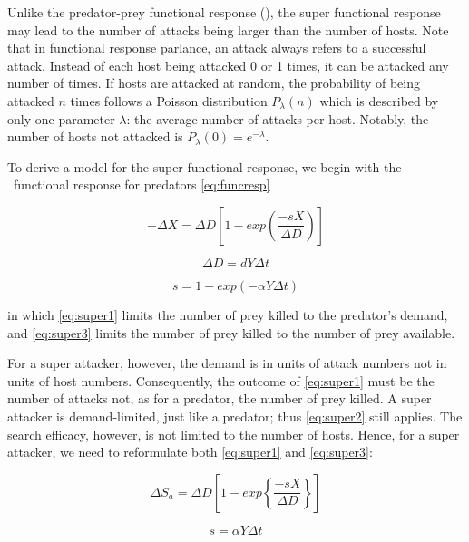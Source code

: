 Unlike the predator-prey functional response (), the super functional response may lead to the number of attacks being larger than the number of hosts. Note that in functional response parlance, an attack always refers to a successful attack. Instead of each host being attacked 0 or 1 times, it can be attacked any number of times. If hosts are attacked at random, the probability of being attacked $n$ times follows a Poisson distribution $P_{\lambda}(n)$ which is described by only one parameter $\lambda$: the average number of attacks per host. Notably, the number of hosts not attacked is $P_{\lambda}(0)=e^{-\lambda}$.

To derive a model for the super functional response, we begin with the \GB\ functional response for predators \eqref{eq:funcresp}

\begin{equation}
-\Delta X = \Delta D \left[1-exp\left(\frac{-sX}{\Delta D}\right)\right] \label{eq:super1}
\end{equation}

\begin{equation}
  \Delta D = dY\Delta t \label{eq:super2}
\end{equation}

\begin{equation}
  s = 1-exp(-\alpha Y \Delta t) \label{eq:super3}
\end{equation}

\noindent in which \eqref{eq:super1} limits the number of prey killed to the predator's demand, and \eqref{eq:super3} limits the number of prey killed to the number of prey available. 

For a super attacker, however, the demand is in units of attack numbers not in units of host numbers. Consequently, the outcome of \eqref{eq:super1} must be the number of attacks not, as for a predator, the number of prey killed. A super attacker is demand-limited, just like a predator; thus \eqref{eq:super2} still applies. The search efficacy, however, is not limited to the number of hosts. Hence, for a super attacker, we need to reformulate both \eqref{eq:super1} and \eqref{eq:super3}:

\begin{equation}
  \Delta S_a = \Delta D \left[1-exp\left\{\frac{-sX}{\Delta D}\right\}\right] \label{eq:super4}
\end{equation}

\begin{equation}
  s = \alpha Y \Delta t \label{eq:super5}
\end{equation}


